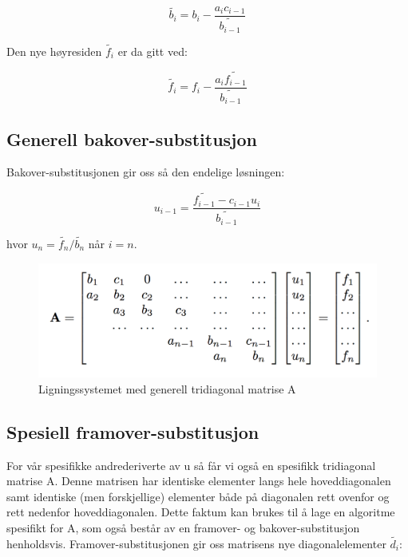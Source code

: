 \documentclass[twocolumn]{article}
\begin{document}
\begin{equation}
\tilde{b_i} = b_i - \frac{a_i c_{i-1}}{\tilde{b_{i-1}}}
\end{equation}

Den nye høyresiden $\tilde{f_i}$ er da gitt ved:

\begin{equation}
\tilde{f_i} = f_i - \frac{a_i \tilde{f_{i-1}}}{\tilde{b_{i-1}}}
\end{equation}

\subsection*{Generell bakover-substitusjon}
Bakover-substitusjonen gir oss så den endelige løsningen:

\begin{equation}
u_{i-1} = \frac{\tilde{f_{i-1}} - c_{i-1} u_i}{\tilde{b_{i-1}}}
\end{equation}

hvor $u_n = \tilde{f_n}/ \tilde{b_n}$ når $i = n$.

\begin{figure}[h!]

  \includegraphics[width=\linewidth]{pict_1.png}
  \caption{Ligningssystemet med generell tridiagonal matrise A}
\end{figure}

\subsection*{Spesiell framover-substitusjon}
For vår spesifikke andrederiverte av u så får vi også en spesifikk tridiagonal matrise A. Denne matrisen har identiske elementer langs hele hoveddiagonalen samt identiske (men forskjellige) elementer både på diagonalen rett ovenfor og rett nedenfor hoveddiagonalen. Dette faktum kan brukes til å lage en algoritme spesifikt for A, som også består av en framover- og bakover-substitusjon henholdsvis. Framover-substitusjonen gir oss matrisens nye diagonalelementer $\tilde{d_i}$:
\end{document}
